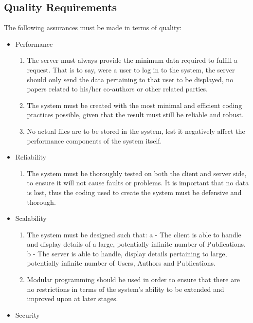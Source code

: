 \documentclass[hidelinks,a4paper,12pt]{article}
\begin{document}
	\subsection{Quality Requirements}
	The following assurances must be made in terms of quality:
	\begin{itemize}
		\item Performance
		\begin{enumerate}
			\item The server must always provide the minimum data required to fulfill a request. That is to say, were a user to log in to the system, the server should only send the data pertaining to that user to be displayed, no papers related to his/her co-authors or other related parties. 
			\item The system must be created with the most minimal and efficient coding practices possible, given that the result must still be reliable and robust.
			\item No actual files are to be stored in the system, lest it negatively affect the performance components of the system itself.
		\end{enumerate}
		\item Reliability
		\begin{enumerate}
			\item The system must be thoroughly tested on both the client and server side, to ensure it will not cause faults or problems. It is important that no data is lost, thus the coding used to create the system must be defensive and thorough.
		\end{enumerate}
		\newpage
		\item Scalability
		\begin{enumerate}
			\item The system must be designed such that:
			\newline
	 a - The client is able to handle and display details of a large, potentially infinite number of Publications.\newline
				b - The server is able to handle, display details pertaining to large, potentially infinite number of Users, Authors and Publications.	
			\item Modular programming should be used in order to ensure that there are no restrictions in terms of the system's ability to be extended and improved upon at later stages.
		\end{enumerate}
		\item Security
		\begin{enumerate}

\end{enumerate}
\end{itemize}
\end{document}
